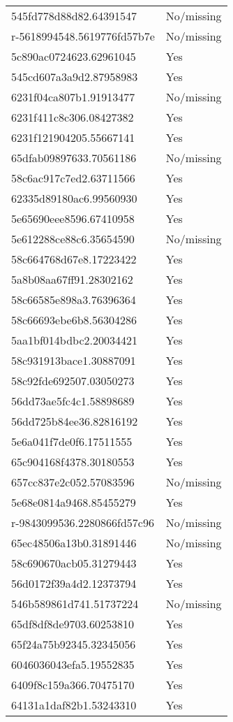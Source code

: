 \begin{tabular}{ll}
545fd778d88d82.64391547 & No/missing \\
r-5618994548.5619776fd57b7e & No/missing \\
5c890ac0724623.62961045 & Yes \\
545cd607a3a9d2.87958983 & Yes \\
6231f04ca807b1.91913477 & No/missing \\
6231f411c8c306.08427382 & Yes \\
6231f121904205.55667141 & Yes \\
65dfab09897633.70561186 & No/missing \\
58c6ac917c7ed2.63711566 & Yes \\
62335d89180ac6.99560930 & Yes \\
5e65690eee8596.67410958 & Yes \\
5e612288ce88c6.35654590 & No/missing \\
58c664768d67e8.17223422 & Yes \\
5a8b08aa67ff91.28302162 & Yes \\
58c66585e898a3.76396364 & Yes \\
58c66693ebe6b8.56304286 & Yes \\
5aa1bf014bdbc2.20034421 & Yes \\
58c931913bace1.30887091 & Yes \\
58c92fde692507.03050273 & Yes \\
56dd73ae5fc4c1.58898689 & Yes \\
56dd725b84ee36.82816192 & Yes \\
5e6a041f7de0f6.17511555 & Yes \\
65c904168f4378.30180553 & Yes \\
657cc837e2c052.57083596 & No/missing \\
5e68e0814a9468.85455279 & Yes \\
r-9843099536.2280866fd57c96 & No/missing \\
65ec48506a13b0.31891446 & No/missing \\
58c690670acb05.31279443 & Yes \\
56d0172f39a4d2.12373794 & Yes \\
546b589861d741.51737224 & No/missing \\
65df8df8de9703.60253810 & Yes \\
65f24a75b92345.32345056 & Yes \\
6046036043efa5.19552835 & Yes \\
6409f8c159a366.70475170 & Yes \\
64131a1daf82b1.53243310 & Yes \\

\end{tabular}
